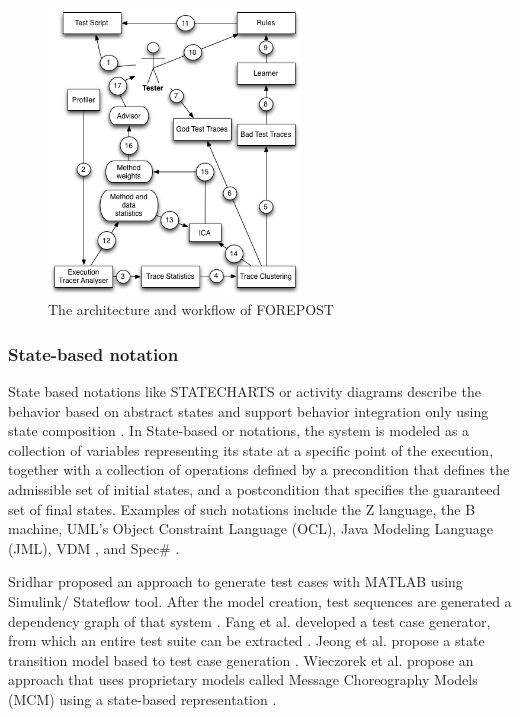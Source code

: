 \documentclass[espaco=umemeio,chapter=TITLE,twoside,openright]{abnt}
\begin{document}
\begin{figure}[!ht]
\centering
\includegraphics[width=0.6\textwidth]{./images/FOREPOST.png}
\caption{The architecture and workflow of FOREPOST}
\label{fig:forepost}

\end{figure}


\subsubsection{State-based notation}

State based notations like STATECHARTS
or activity diagrams describe the behavior based on abstract
states and support behavior integration only using
state composition \cite{Giese1999}. In State-based or notations, the system is modeled as a collection of variables representing its state at a specific point of the execution, together with a collection of operations defined by a precondition that defines the
admissible set of initial states, and a postcondition that specifies the guaranteed
set of final states. Examples of such notations include the Z language, the
B machine, UML’s Object Constraint Language (OCL), Java Modeling
Language (JML), VDM , and Spec\# \cite{Marinescu2015}.

Sridhar proposed an approach to generate test cases with MATLAB using Simulink/ Stateflow tool. After the model creation, test sequences are generated a dependency graph of that system \cite{Sridhar2013}.  Fang et al. developed a test case generator, from which an entire test suite can be extracted \cite{Fang2012}.  Jeong et al. propose
a state transition model based to test case generation \cite{Jeong2016}. Wieczorek et al. propose an approach that uses proprietary models called Message Choreography Models (MCM) using a state-based representation \cite{Wieczorek2010}.
\end{document}
